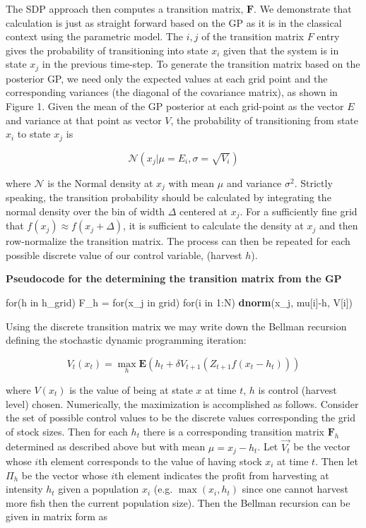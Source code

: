 \documentclass[author-year, review]{elsarticle} %
\newenvironment{Shaded}{}{}
\newcommand{\KeywordTok}[1]{\textcolor[rgb]{0.00,0.44,0.13}{\textbf{{#1}}}}
\newcommand{\DecValTok}[1]{\textcolor[rgb]{0.25,0.63,0.44}{{#1}}}
\newcommand{\NormalTok}[1]{{#1}}
\begin{document}
The SDP approach then computes a transition matrix, $\mathbf{F}$. We
demonstrate that calculation is just as straight forward based on the GP
as it is in the classical context using the parametric model. The
${i,j}$ of the transition matrix $F$ entry gives the probability of
transitioning into state $x_i$ given that the system is in state $x_j$
in the previous time-step. To generate the transition matrix based on
the posterior GP, we need only the expected values at each grid point
and the corresponding variances (the diagonal of the covariance matrix),
as shown in Figure 1. Given the mean of the GP posterior at each
grid-point as the vector $E$ and variance at that point as vector $V$,
the probability of transitioning from state $x_i$ to state $x_j$ is

\[\mathcal{N}\left(x_j \vert  \mu = E_i, \sigma = \sqrt{V_i}\right)\]

where $\mathcal{N}$ is the Normal density at $x_j$ with mean $\mu$ and
variance $\sigma^2$. Strictly speaking, the transition probability
should be calculated by integrating the normal density over the bin of
width $\Delta$ centered at $x_j$. For a sufficiently fine grid that
$f(x_j) \approx f(x_j + \Delta)$, it is sufficient to calculate the
density at $x_j$ and then row-normalize the transition matrix. The
process can then be repeated for each possible discrete value of our
control variable, (harvest $h$).

\textbf{Pseudocode for the determining the transition matrix from the
GP}

\begin{Shaded}
\begin{Highlighting}[]
\NormalTok{for(h in h_grid)}
  \NormalTok{F_h = for(x_j in grid)}
          \NormalTok{for(i in }\DecValTok{1}\NormalTok{:N) }
            \KeywordTok{dnorm}\NormalTok{(x_j, mu[i]-h, V[i])}
\end{Highlighting}
\end{Shaded}

Using the discrete transition matrix we may write down the Bellman
recursion defining the stochastic dynamic programming iteration:

\begin{equation}
V_t(x_t) = \max_h \mathbf{E} \left( h_t + \delta V_{t+1}( Z_{t+1} f(x_t - h_t)) \right)
\end{equation}

where $V(x_t)$ is the value of being at state $x$ at time $t$, $h$ is
control (harvest level) chosen. Numerically, the maximization is
accomplished as follows. Consider the set of possible control values to
be the discrete values corresponding the grid of stock sizes. Then for
each $h_t$ there is a corresponding transition matrix $\mathbf{F}_h$
determined as described above but with mean $\mu = x_j - h_t$. Let
$\vec{V_t}$ be the vector whose $i$th element corresponds to the value
of having stock $x_i$ at time $t$. Then let $\Pi_h$ be the vector whose
$i$th element indicates the profit from harvesting at intensity $h_t$
given a population $x_i$ (e.g. $\max(x_i, h_t)$ since one cannot harvest
more fish then the current population size). Then the Bellman recursion
can be given in matrix form as
\end{document}
